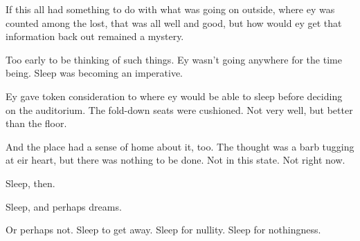 If this all had something to do with what was going on outside, where ey was counted among the lost, that was all well and good, but how would ey get that information back out remained a mystery.

Too early to be thinking of such things. Ey wasn't going anywhere for the time being. Sleep was becoming an imperative.

Ey gave token consideration to where ey would be able to sleep before deciding on the auditorium. The fold-down seats were cushioned. Not very well, but better than the floor.

And the place had a sense of home about it, too. The thought was a barb tugging at eir heart, but there was nothing to be done. Not in this state. Not right now.

Sleep, then.

Sleep, and perhaps dreams.

Or perhaps not. Sleep to get away. Sleep for nullity. Sleep for nothingness.
